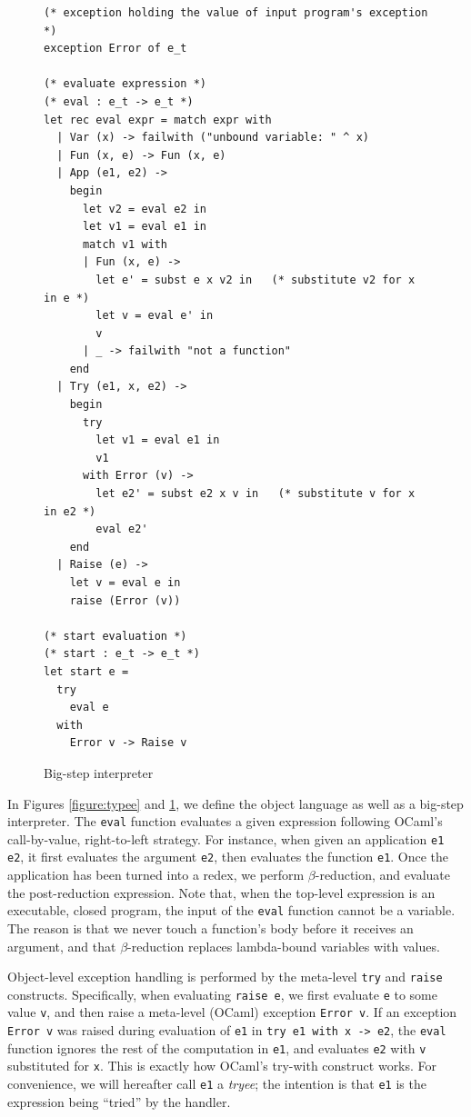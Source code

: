 \begin{figure}
\begin{verbatim}
(* exception holding the value of input program's exception *)
exception Error of e_t

(* evaluate expression *)
(* eval : e_t -> e_t *)
let rec eval expr = match expr with
  | Var (x) -> failwith ("unbound variable: " ^ x)
  | Fun (x, e) -> Fun (x, e)
  | App (e1, e2) ->
    begin
      let v2 = eval e2 in
      let v1 = eval e1 in
      match v1 with
      | Fun (x, e) ->
        let e' = subst e x v2 in   (* substitute v2 for x in e *)
        let v = eval e' in
        v
      | _ -> failwith "not a function"
    end
  | Try (e1, x, e2) ->
    begin
      try
        let v1 = eval e1 in
        v1
      with Error (v) ->
        let e2' = subst e2 x v in   (* substitute v for x in e2 *)
        eval e2'
    end
  | Raise (e) ->
    let v = eval e in
    raise (Error (v))

(* start evaluation *)
(* start : e_t -> e_t *)
let start e =
  try
    eval e
  with
    Error v -> Raise v
\end{verbatim}
\caption{Big-step interpreter}
\label{figure:interpreter}
\end{figure}

In Figures \ref{figure:typee} and \ref{figure:interpreter},
we define the object language as well as a big-step interpreter.
The \texttt{eval} function evaluates a given expression following OCaml's call-by-value, right-to-left strategy.
For instance, when given an application \texttt{e1 e2},
it first evaluates the argument \texttt{e2}, then evaluates the function \texttt{e1}.
Once the application has been turned into a redex, we perform $\beta$-reduction, and evaluate the post-reduction expression.
Note that, when the top-level expression is an executable, closed program, the input of the \texttt{eval} function cannot be a variable.  The reason is that we never touch a function's body before it receives an argument, and that $\beta$-reduction replaces lambda-bound variables with values.

Object-level exception handling is performed by the meta-level \texttt{try} and \texttt{raise} constructs.
Specifically, when evaluating \texttt{raise e},
we first evaluate \texttt{e} to some value \texttt{v},
and then raise a meta-level (OCaml) exception \texttt{Error v}.
If an exception \texttt{Error v} was raised during evaluation of \texttt{e1} in \texttt{try e1 with x -> e2}, the \texttt{eval} function ignores the rest of the computation in \texttt{e1}, and evaluates \texttt{e2} with \texttt{v} substituted for \texttt{x}.  This is exactly how OCaml's try-with construct works.  For convenience, we will hereafter call \texttt{e1} a \emph{tryee}; the intention is that \texttt{e1} is the expression being ``tried'' by the handler.   

